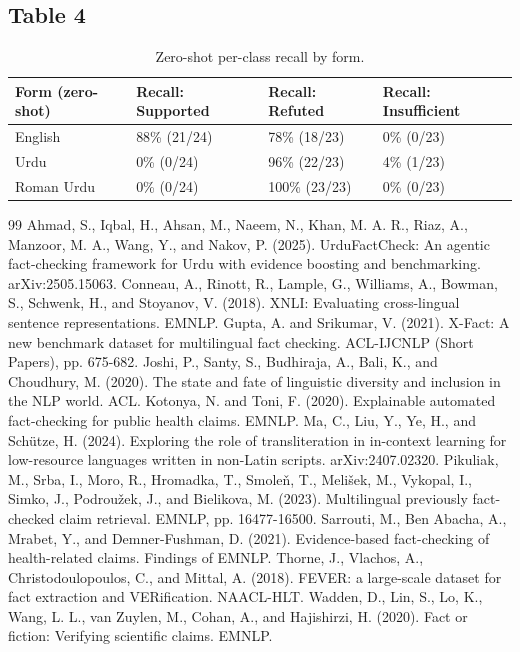 \documentclass[10pt,a4paper]{article}
\begin{document}
\subsection{Table 4}
\begin{table}[t]
\centering
\scriptsize
\begin{tabular}{llll}
\toprule
Form (zero-shot) & Recall: Supported & Recall: Refuted & Recall: Insufficient \\
\midrule
English & 88\% (21/24) & 78\% (18/23) & 0\% (0/23) \\
Urdu & 0\% (0/24) & 96\% (22/23) & 4\% (1/23) \\
Roman Urdu & 0\% (0/24) & 100\% (23/23) & 0\% (0/23) \\
\bottomrule
\end{tabular}
\caption{Zero-shot per-class recall by form.}
\end{table}
\begin{thebibliography}{99}
 Ahmad, S., Iqbal, H., Ahsan, M., Naeem, N., Khan, M. A. R., Riaz, A., Manzoor, M. A., Wang, Y., and Nakov, P. (2025). UrduFactCheck: An agentic fact-checking framework for Urdu with evidence boosting and benchmarking. arXiv:2505.15063.
 Conneau, A., Rinott, R., Lample, G., Williams, A., Bowman, S., Schwenk, H., and Stoyanov, V. (2018). XNLI: Evaluating cross-lingual sentence representations. EMNLP.
 Gupta, A. and Srikumar, V. (2021). X-Fact: A new benchmark dataset for multilingual fact checking. ACL-IJCNLP (Short Papers), pp. 675-682.
 Joshi, P., Santy, S., Budhiraja, A., Bali, K., and Choudhury, M. (2020). The state and fate of linguistic diversity and inclusion in the NLP world. ACL.
 Kotonya, N. and Toni, F. (2020). Explainable automated fact-checking for public health claims. EMNLP.
 Ma, C., Liu, Y., Ye, H., and Schütze, H. (2024). Exploring the role of transliteration in in-context learning for low-resource languages written in non-Latin scripts. arXiv:2407.02320.
 Pikuliak, M., Srba, I., Moro, R., Hromadka, T., Smoleň, T., Melišek, M., Vykopal, I., Simko, J., Podroužek, J., and Bielikova, M. (2023). Multilingual previously fact-checked claim retrieval. EMNLP, pp. 16477-16500.
 Sarrouti, M., Ben Abacha, A., Mrabet, Y., and Demner-Fushman, D. (2021). Evidence-based fact-checking of health-related claims. Findings of EMNLP.
 Thorne, J., Vlachos, A., Christodoulopoulos, C., and Mittal, A. (2018). FEVER: a large-scale dataset for fact extraction and VERification. NAACL-HLT.
 Wadden, D., Lin, S., Lo, K., Wang, L. L., van Zuylen, M., Cohan, A., and Hajishirzi, H. (2020). Fact or fiction: Verifying scientific claims. EMNLP.
\end{thebibliography}
\end{document}
